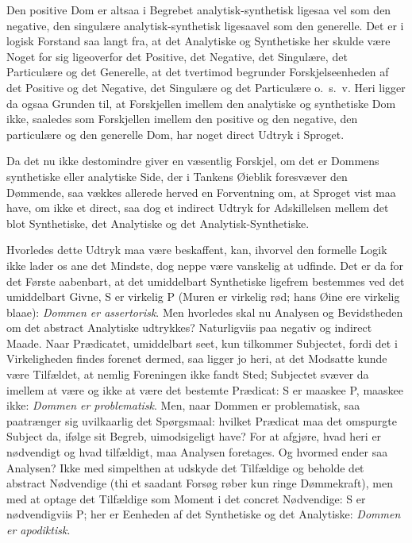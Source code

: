 \documentclass[12pt]{book}
\newcommand{\opage}[1]{\marginnote{\footnotesize\textit{[#1]}}}
\begin{document}
Den positive Dom er altsaa i Begrebet analytisk-synthetisk ligesaa vel som den negative, den singulære analytisk-synthetisk ligesaavel som den generelle. Det er i logisk Forstand saa langt fra, at det Analytiske og Synthetiske her skulde være Noget for sig ligeoverfor det Positive, det Negative, det Singulære, det Particulære og det Generelle, at det tvertimod begrunder Forskjelseenheden af det Positive og det Negative, det Singulære og det Particulære o.~s.~v. Heri ligger da ogsaa Grunden til, at Forskjellen imellem den analytiske og synthetiske Dom ikke, saaledes som Forskjellen imellem den positive og den negative, den particulære og den generelle Dom, har noget direct Udtryk i Sproget.

Da det nu ikke destomindre giver en væsentlig Forskjel, om det er Dommens synthetiske eller analytiske Side, der i Tankens Øieblik foresvæver den Dømmende, saa vækkes allerede herved en Forventning om, at Sproget vist maa have, om ikke et direct, saa dog et indirect Udtryk for Adskillelsen mellem det blot Synthetiske, det Analytiske og det Analytisk-Synthetiske.

Hvorledes dette Udtryk maa være beskaffent, kan, ihvorvel den formelle Logik ikke lader os ane det Mindste, dog neppe være vanskelig at udfinde. Det er da for det Første aabenbart, at det umiddelbart Synthetiske ligefrem bestemmes ved det umiddelbart Givne, S er virkelig P (Muren er virkelig rød; hans Øine ere virkelig blaae): \emph{Dommen er assertorisk}. Men hvorledes skal nu Analysen og Bevidstheden om det abstract %
\opage{59}Analytiske udtrykkes? Naturligviis paa negativ og indirect Maade. Naar Prædicatet, umiddelbart seet, kun tilkommer Subjectet, fordi det i Virkeligheden findes forenet dermed, saa ligger jo heri, at det Modsatte kunde være Tilfældet, at nemlig Foreningen ikke fandt Sted; Subjectet svæver da imellem at være og ikke at være det bestemte Prædicat: S er maaskee P, maaskee ikke: \emph{Dommen er problematisk}. Men, naar Dommen er problematisk, saa paatrænger sig uvilkaarlig det Spørgsmaal: hvilket Prædicat maa det omspurgte Subject da, ifølge sit Begreb, uimodsigeligt have? For at afgjøre, hvad heri er nødvendigt og hvad tilfældigt, maa Analysen foretages. Og hvormed ender saa Analysen? Ikke med simpelthen at udskyde det Tilfældige og beholde det abstract Nødvendige (thi et saadant Forsøg røber kun ringe Dømmekraft), men med at optage det Tilfældige som Moment i det concret Nødvendige: S er nødvendigviis P; her er Eenheden af det Synthetiske og det Analytiske: \emph{Dommen er apodiktisk}.
\end{document}
